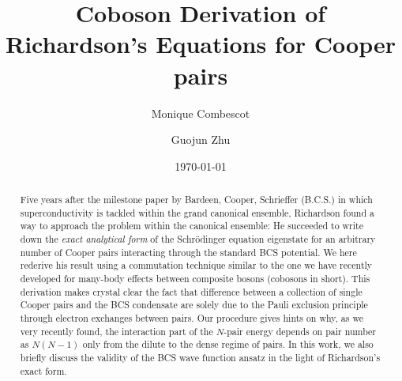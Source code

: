 \documentclass[aps,prb,superscriptaddress,twocolumn]{revtex4}
\begin{document}
\title{Coboson Derivation of Richardson's Equations for Cooper pairs}
\author{Monique Combescot}
\author{Guojun Zhu}

\date{\today}

\begin{abstract}
Five years after the milestone paper by Bardeen, Cooper, Schrieffer (B.C.S.) in which
superconductivity is tackled within the grand canonical ensemble, 
Richardson found a way to approach the problem within the canonical ensemble: He succeeded to
write down the \textit{exact analytical form} of the Schr\"{o}dinger equation eigenstate for
an arbitrary number of Cooper pairs interacting through the standard BCS
potential. We here rederive his result using a commutation technique similar to the one we
have recently developed for many-body effects between composite bosons
(cobosons in short). This derivation makes crystal clear the fact that difference
between a collection of single Cooper pairs and the BCS condensate are solely due to the Pauli exclusion principle
through electron exchanges between pairs. Our procedure gives hints on
why, as we very recently found, the interaction part of the $N$-pair energy
depends on pair number as $N(N-1)$ only from the dilute to the dense regime
of pairs. In this work, we also briefly discuss the validity of the BCS wave
function ansatz in the light of Richardson's exact form.
\end{abstract}

\pacs{}
\maketitle



\end{document}
